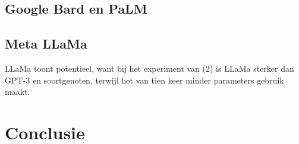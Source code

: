 \subsection{Google Bard en PaLM}



\subsection{Meta LLaMa}



LLaMa toont potentieel, want bij het experiment van (2) is LLaMa sterker dan GPT-3 en soortgenoten, terwijl het van tien keer minder parameters gebruik maakt.


\section{Conclusie}


